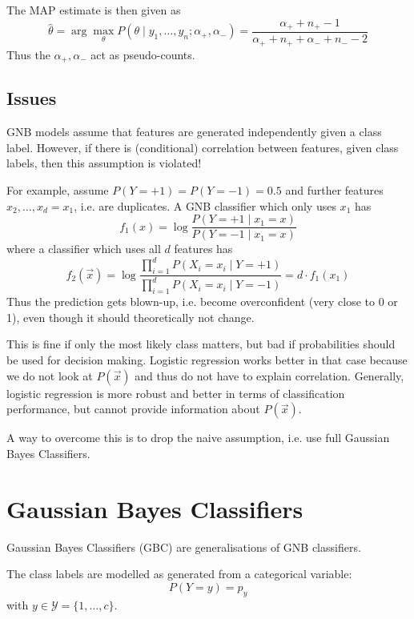 The MAP estimate is then given as
\begin{equation*}
\hat{\theta} = \arg\max_{\theta}{P(\theta \mid y_1, \dotsc, y_n; \alpha_+, \alpha_-)}
= \frac{\alpha_+ + n_+ - 1}{\alpha_+ + n_+ + \alpha_- + n_- - 2}
\end{equation*}
Thus the $\alpha_+, \alpha_-$ act as pseudo-counts.


\subsection{Issues}
GNB models assume that features are generated
independently given a class label.
However, if there is (conditional)
correlation between features, given class labels,
then this assumption is violated!

For example,
assume $P(Y = +1) = P(Y = -1) = 0.5$ and
further features
$x_2, \dotsc, x_d = x_1$,
i.e. are duplicates.
A GNB classifier which only uses $x_1$
has
\begin{equation*}
f_1(x) = \log{
	\frac{P(Y = +1 \mid x_1 = x)}
	{P(Y = -1 \mid x_1 = x)}
}
\end{equation*}
where a classifier which uses all $d$
features has
\begin{equation*}
f_2(\vec{x}) = \log{
	\frac
	{\prod_{i=1}^d{P(X_i = x_i \mid Y = +1)}}
	{\prod_{i=1}^d{P(X_i = x_i \mid Y = -1)}}
}
= d \cdot f_1(x_1)
\end{equation*}
Thus the prediction gets blown-up,
i.e. become overconfident
(very close to 0 or 1),
even though it should theoretically not change.

This is fine if only the most likely class
matters, but bad if probabilities should
be used for decision making.
Logistic regression works better in that case
because we do not look at $P(\vec{x})$ and thus
do not have to explain correlation.
Generally, logistic regression is more
robust and better in terms of classification
performance, but cannot provide information
about $P(\vec{x})$.

A way to overcome this is to
drop the naive assumption,
i.e. use full Gaussian Bayes Classifiers.


\section{Gaussian Bayes Classifiers}
Gaussian Bayes Classifiers (GBC) are
generalisations of GNB classifiers.

The class labels are modelled as generated
from a categorical variable:
\begin{equation*}
P(Y = y) = p_y
\end{equation*}
with $y \in \mathcal{Y} = \{1, \dotsc, c\}$.

